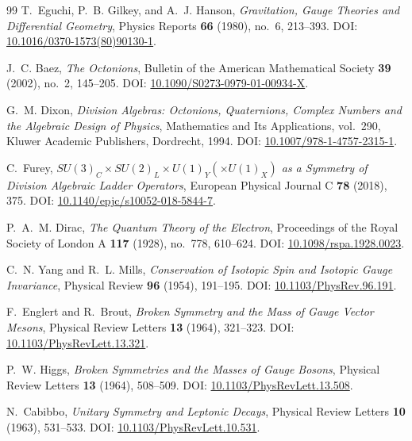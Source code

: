 \documentclass[12pt,a4paper]{article}
\begin{document}
\begin{thebibliography}{99}
T.~Eguchi, P.~B. Gilkey, and A.~J. Hanson,
\emph{Gravitation, Gauge Theories and Differential Geometry},
Physics Reports \textbf{66} (1980), no.~6, 213--393.
\newblock DOI: \href{https://doi.org/10.1016/0370-1573(80)90130-1}{10.1016/0370-1573(80)90130-1}.

J.~C. Baez,
\emph{The Octonions},
Bulletin of the American Mathematical Society \textbf{39} (2002), no.~2, 145--205.
\newblock DOI: \href{https://doi.org/10.1090/S0273-0979-01-00934-X}{10.1090/S0273-0979-01-00934-X}.

G.~M. Dixon,
\emph{Division Algebras: Octonions, Quaternions, Complex Numbers and the Algebraic Design of Physics},
Mathematics and Its Applications, vol.~290,
Kluwer Academic Publishers, Dordrecht, 1994.
\newblock DOI: \href{https://doi.org/10.1007/978-1-4757-2315-1}{10.1007/978-1-4757-2315-1}.

C.~Furey,
\emph{$SU(3)_C\times SU(2)_L\times U(1)_Y\left(\times U(1)_X\right)$ as a Symmetry of Division Algebraic Ladder Operators},
European Physical Journal C \textbf{78} (2018), 375.
\newblock DOI: \href{https://doi.org/10.1140/epjc/s10052-018-5844-7}{10.1140/epjc/s10052-018-5844-7}.

P.~A.~M. Dirac,
\emph{The Quantum Theory of the Electron},
Proceedings of the Royal Society of London A \textbf{117} (1928), no.~778, 610--624.
\newblock DOI: \href{https://doi.org/10.1098/rspa.1928.0023}{10.1098/rspa.1928.0023}.

C.~N. Yang and R.~L. Mills,
\emph{Conservation of Isotopic Spin and Isotopic Gauge Invariance},
Physical Review \textbf{96} (1954), 191--195.
\newblock DOI: \href{https://doi.org/10.1103/PhysRev.96.191}{10.1103/PhysRev.96.191}.

F.~Englert and R.~Brout,
\emph{Broken Symmetry and the Mass of Gauge Vector Mesons},
Physical Review Letters \textbf{13} (1964), 321--323.
\newblock DOI: \href{https://doi.org/10.1103/PhysRevLett.13.321}{10.1103/PhysRevLett.13.321}.

P.~W. Higgs,
\emph{Broken Symmetries and the Masses of Gauge Bosons},
Physical Review Letters \textbf{13} (1964), 508--509.
\newblock DOI: \href{https://doi.org/10.1103/PhysRevLett.13.508}{10.1103/PhysRevLett.13.508}.

N.~Cabibbo,
\emph{Unitary Symmetry and Leptonic Decays},
Physical Review Letters \textbf{10} (1963), 531--533.
\newblock DOI: \href{https://doi.org/10.1103/PhysRevLett.10.531}{10.1103/PhysRevLett.10.531}.


\end{thebibliography}
\end{document}
